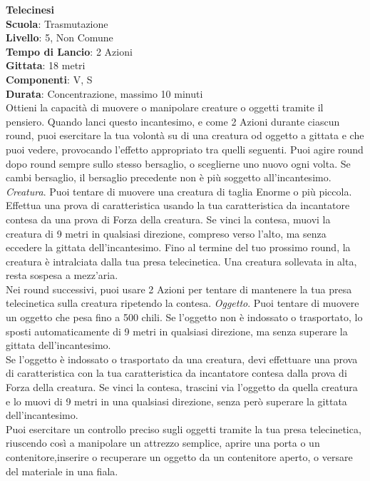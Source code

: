 \begin{multicols}{2}
\medskip\textbf{Telecinesi}\\
\textbf{Scuola}: Trasmutazione\\
\textbf{Livello}: 5, Non Comune\\
\textbf{Tempo di Lancio}: 2 Azioni\\
\textbf{Gittata}: 18 metri\\
\textbf{Componenti}: V, S\\
\textbf{Durata}: Concentrazione, massimo 10 minuti \\
Ottieni la capacità di muovere o manipolare creature o oggetti tramite il pensiero. Quando lanci questo incantesimo, e come 2 Azioni durante ciascun round, puoi esercitare la tua volontà su di una creatura od oggetto a gittata e che puoi vedere, provocando l'effetto appropriato tra quelli seguenti. Puoi agire round dopo round sempre sullo stesso bersaglio, o sceglierne uno nuovo ogni volta. Se cambi bersaglio, il bersaglio precedente non è più soggetto all'incantesimo.
\textit{Creatura}. Puoi tentare di muovere una creatura di taglia Enorme o più piccola. Effettua una prova di caratteristica usando la tua caratteristica da incantatore contesa da una prova di Forza della creatura. Se vinci la contesa, muovi la creatura di 9 metri in qualsiasi direzione, compreso verso l'alto, ma senza eccedere la gittata dell'incantesimo. Fino al termine del tuo prossimo round, la creatura è intralciata dalla tua presa telecinetica. Una creatura sollevata in alta, resta sospesa a mezz'aria.\\
Nei round successivi, puoi usare 2 Azioni per tentare di mantenere la tua presa telecinetica sulla creatura ripetendo la contesa.
\textit{Oggetto}. Puoi tentare di muovere un oggetto che pesa fino a 500 chili. Se l'oggetto non è indossato o trasportato, lo sposti automaticamente di 9 metri in qualsiasi direzione, ma senza superare la gittata dell'incantesimo.\\
Se l'oggetto è indossato o trasportato da una creatura, devi effettuare una prova di caratteristica con la tua caratteristica da incantatore contesa dalla prova di Forza della creatura. Se vinci la contesa, trascini via l'oggetto da quella creatura e lo muovi di 9 metri in una qualsiasi direzione, senza però superare la gittata dell'incantesimo.\\
Puoi esercitare un controllo preciso sugli oggetti tramite la tua presa telecinetica, riuscendo così a manipolare un attrezzo semplice, aprire una porta o un contenitore,inserire o recuperare un oggetto da un contenitore aperto, o versare del materiale in una fiala.


\end{multicols}
